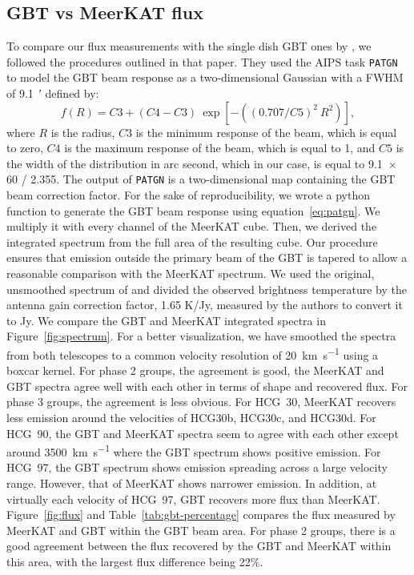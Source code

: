 \documentclass{aa}
\begin{document}
\subsection{GBT vs MeerKAT flux}
To compare our flux measurements with the single dish GBT ones by \citet{2010ApJ...710..385B}, we followed the procedures outlined 
in that paper. They used the AIPS task \texttt{PATGN} to model the GBT beam response as a two-dimensional Gaussian with a FWHM of \SI{9.1}{\arcminute} defined by:
\begin{equation}\label{eq:patgn}
    f(R) = C3 + (C4 - C3)~\exp[-((0.707/C5)^{2}~R^{2})],
\end{equation}
where $R$ is the radius, $C3$ is the minimum response of the beam, which is equal to zero, $C4$ is the maximum response of the beam, 
which is equal to 1, and $C5$ is the width of the distribution in arc second, which in our case, is equal to 9.1~$\times$ 60 / 2.355. 
The output of \texttt{PATGN} is a two-dimensional map containing the GBT beam correction factor. For the sake of reproducibility, 
we wrote a python function to generate the GBT beam response using equation~\ref{eq:patgn}. We multiply 
it with every channel of the MeerKAT cube. Then, we derived the integrated spectrum from the full area of the resulting cube. 
Our procedure ensures that emission outside the primary beam of the GBT is tapered to allow a reasonable comparison 
with the MeerKAT spectrum. We used the original, unsmoothed spectrum of \citet{2010ApJ...710..385B} and divided the observed brightness 
temperature by the antenna gain correction factor, 1.65 K/Jy, measured by the authors to convert it to Jy. We compare the GBT and MeerKAT integrated spectra 
in Figure~\ref{fig:spectrum}. For a better visualization, we have smoothed the spectra from both telescopes to a common velocity resolution of 
\qty{20}{km~s^{-1}} using a boxcar kernel. For phase 2 groups, the agreement is good, the MeerKAT and GBT spectra agree well with each other in terms of shape and 
recovered flux. For phase 3 groups, the agreement is less obvious. For HCG~30, MeerKAT recovers less emission around the velocities of HCG30b, HCG30c, and HCG30d. 
For HCG~90, the GBT and MeerKAT spectra seem to agree with each other except around \qty{3500}{km~s^{-1}} where the GBT spectrum shows positive emission. 
For HCG~97, the GBT spectrum shows emission spreading across a large velocity range. However, that of MeerKAT shows narrower emission. 
In addition, at virtually each velocity of HCG~97, GBT recovers 
more flux than MeerKAT. Figure~\ref{fig:flux} and Table~\ref{tab:gbt-percentage} compares the flux measured by MeerKAT and GBT within the GBT beam area. For phase 2 groups, there is a good agreement between the flux recovered by the GBT and MeerKAT within this area, with the largest flux difference being 22\%. 
\end{document}
